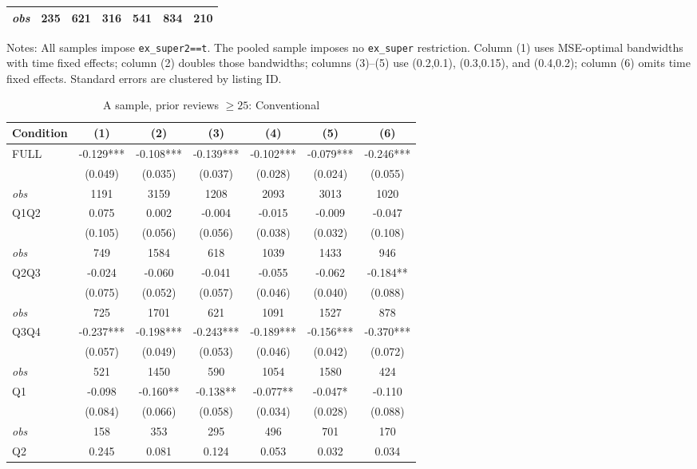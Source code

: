 \begin{table}[!htbp]
\begin{tabular}{lcccccc}
\textit{obs} & 235 & 621 & 316 & 541 & 834 & 210 \\
\bottomrule
\end{tabular}
\begin{minipage}{0.98\textwidth}\footnotesize
Notes: All samples impose \texttt{ex\_super2==t}. The pooled sample imposes no \texttt{ex\_super} restriction. Column (1) uses MSE-optimal bandwidths with time fixed effects; column (2) doubles those bandwidths; columns (3)--(5) use (0.2,0.1), (0.3,0.15), and (0.4,0.2); column (6) omits time fixed effects. Standard errors are clustered by listing ID.
\end{minipage}
\end{table}

\begin{table}[!htbp]
\centering
\caption{A sample, prior reviews $\geq25$: Conventional}
\begin{tabular}{lcccccc}
\toprule
Condition & (1) & (2) & (3) & (4) & (5) & (6) \\
\midrule
FULL & -0.129*** & -0.108*** & -0.139*** & -0.102*** & -0.079*** & -0.246*** \\
 & (0.049) & (0.035) & (0.037) & (0.028) & (0.024) & (0.055) \\
\textit{obs} & 1191 & 3159 & 1208 & 2093 & 3013 & 1020 \\
Q1Q2 & 0.075 & 0.002 & -0.004 & -0.015 & -0.009 & -0.047 \\
 & (0.105) & (0.056) & (0.056) & (0.038) & (0.032) & (0.108) \\
\textit{obs} & 749 & 1584 & 618 & 1039 & 1433 & 946 \\
Q2Q3 & -0.024 & -0.060 & -0.041 & -0.055 & -0.062 & -0.184** \\
 & (0.075) & (0.052) & (0.057) & (0.046) & (0.040) & (0.088) \\
\textit{obs} & 725 & 1701 & 621 & 1091 & 1527 & 878 \\
Q3Q4 & -0.237*** & -0.198*** & -0.243*** & -0.189*** & -0.156*** & -0.370*** \\
 & (0.057) & (0.049) & (0.053) & (0.046) & (0.042) & (0.072) \\
\textit{obs} & 521 & 1450 & 590 & 1054 & 1580 & 424 \\
Q1 & -0.098 & -0.160** & -0.138** & -0.077** & -0.047* & -0.110 \\
 & (0.084) & (0.066) & (0.058) & (0.034) & (0.028) & (0.088) \\
\textit{obs} & 158 & 353 & 295 & 496 & 701 & 170 \\
Q2 & 0.245 & 0.081 & 0.124 & 0.053 & 0.032 & 0.034 \\

\end{tabular}
\end{table}
